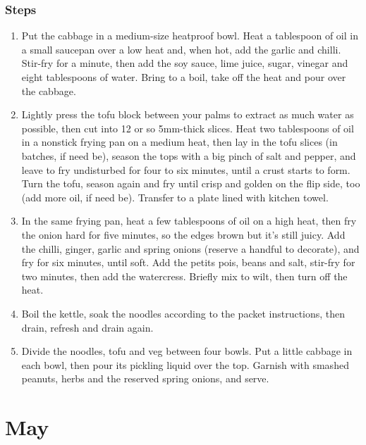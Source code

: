 \documentclass{book}
\begin{document}
\subsection*{Steps}
\begin{enumerate}
\item Put the cabbage in a medium-size heatproof bowl. Heat a tablespoon of oil in a small saucepan over a low heat and, when hot, add the garlic and chilli. Stir-fry for a minute, then add the soy sauce, lime juice, sugar, vinegar and eight tablespoons of water. Bring to a boil, take off the heat and pour over the cabbage.
\item Lightly press the tofu block between your palms to extract as much water as possible, then cut into 12 or so 5mm-thick slices. Heat two tablespoons of oil in a nonstick frying pan on a medium heat, then lay in the tofu slices (in batches, if need be), season the tops with a big pinch of salt and pepper, and leave to fry undisturbed for four to six minutes, until a crust starts to form. Turn the tofu, season again and fry until crisp and golden on the flip side, too (add more oil, if need be). Transfer to a plate lined with kitchen towel.
\item In the same frying pan, heat a few tablespoons of oil on a high heat, then fry the onion hard for five minutes, so the edges brown but it’s still juicy. Add the chilli, ginger, garlic and spring onions (reserve a handful to decorate), and fry for six minutes, until soft. Add the petits pois, beans and salt, stir-fry for two minutes, then add the watercress. Briefly mix to wilt, then turn off the heat.
\item Boil the kettle, soak the noodles according to the packet instructions, then drain, refresh and drain again.
\item Divide the noodles, tofu and veg between four bowls. Put a little cabbage in each bowl, then pour its pickling liquid over the top. Garnish with smashed peanuts, herbs and the reserved spring onions, and serve.
\end{enumerate}
\newpage

\chapter{May}
\end{document}
